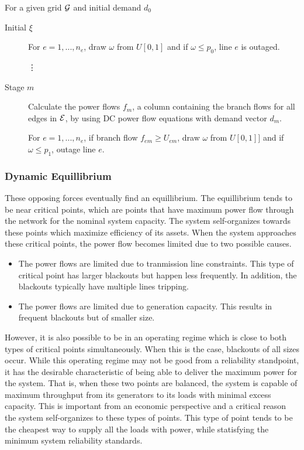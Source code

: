 For a given grid $\mathcal{G}$ and initial demand $d_0$
\begin{description}
\item[ Initial $ \xi $ ]  For $e=1,...,n_e$, draw $\omega$ from $U[0,1]$ and if $\omega \le p_0$, line $e$ is outaged.
\item[ ] \hspace{35px} \vdots 
\item[ Stage $m$ ]  Calculate the power flows $f_{m}$, a column containing the branch flows for all edges in $\mathcal{E}$, by using DC power flow equations with demand vector $d_m$. 

For $e=1,...,n_e$, if branch flow $f_{em} \ge U_{em}$, draw $\omega$ from $U[0,1]]$ and if $\omega \le p_1$, outage line $e$.
\end{description}



\subsubsection{Dynamic Equillibrium}

These opposing forces eventually find an equillibrium.  The equillibrium tends to be near critical points, which are points that have maximum power flow through the network for the nominal system capacity.  The system self-organizes towards these points which maximize efficiency of its assets.  When the system approaches these critical points, the power flow becomes limited due to two possible causes. 
\begin{itemize}
\item The power flows are limited due to tranmission line constraints.  This type of critical point has larger blackouts but happen less frequently.  In addition, the blackouts typically have  multiple lines tripping.
\item The power flows are limited due to generation capacity.  This results in frequent blackouts but of smaller size.
\end{itemize}
However, it is also possible to be in an operating regime which is close to both types of critical points simultaneously.  When this is the case, blackouts of all sizes occur.  While this operating regime may not be good from a reliability standpoint, it has the desirable characteristic of being able to deliver the maximum power for the system.   That is, when these two points are balanced, the system is capable of maximum throughput from its generators to its loads with minimal excess capacity.  This is important from an economic perspective and a critical reason the system self-organizes to these types of points.  This type of point tends to be the cheapest way to supply all the loads with power, while statisfying the minimum system reliability standards.

